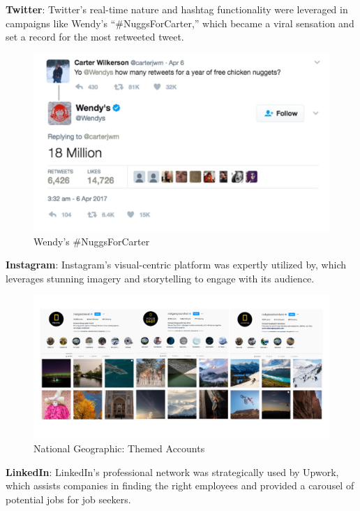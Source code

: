 \documentclass[
]{book}
\begin{document}
\textbf{Twitter}: Twitter's real-time nature and hashtag functionality were leveraged in campaigns like Wendy's ``\#NuggsForCarter,'' which became a viral sensation and set a record for the most retweeted tweet.

\begin{figure}
\centering
\includegraphics[width=1\textwidth,height=\textheight]{images/wendys.jpg}
\caption{Wendy's \#NuggsForCarter}
\end{figure}

\textbf{Instagram}: Instagram's visual-centric platform was expertly utilized by, which leverages stunning imagery and storytelling to engage with its audience.

\begin{figure}
\centering
\includegraphics[width=1\textwidth,height=\textheight]{images/natgeo.png}
\caption{National Geographic: Themed Accounts}
\end{figure}

\textbf{LinkedIn}: LinkedIn's professional network was strategically used by Upwork, which assists companies in finding the right employees and provided a carousel of potential jobs for job seekers.
\end{document}
